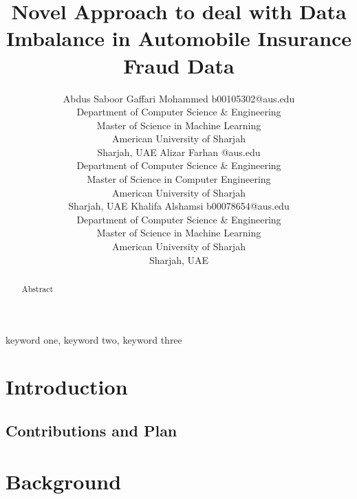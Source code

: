 \documentclass[twoside,11pt]{article}
\begin{document}
\title{Novel Approach to deal with Data Imbalance in Automobile Insurance Fraud Data}

\author{\name Abdus Saboor Gaffari Mohammed \email b00105302@aus.edu \\
        \addr Department of Computer Science \& Engineering\\
        Master of Science in Machine Learning\\
        American University of Sharjah\\
        Sharjah, UAE
        \AND
        \name Alizar Farhan \email @aus.edu \\
        \addr Department of Computer Science \& Engineering\\
        Master of Science in Computer Engineering\\
        American University of Sharjah\\
        Sharjah, UAE
        \AND
        \name Khalifa Alshamsi \email b00078654@aus.edu \\
        \addr Department of Computer Science \& Engineering\\
        Master of Science in Machine Learning\\
        American University of Sharjah\\
        Sharjah, UAE
       } 

\maketitle

\begin{abstract}%
Abstract
\end{abstract}

\begin{keywords}
  keyword one, keyword two, keyword three
\end{keywords}

\section{Introduction}

\subsection{Contributions and Plan}

\section{Background}
\end{document}
